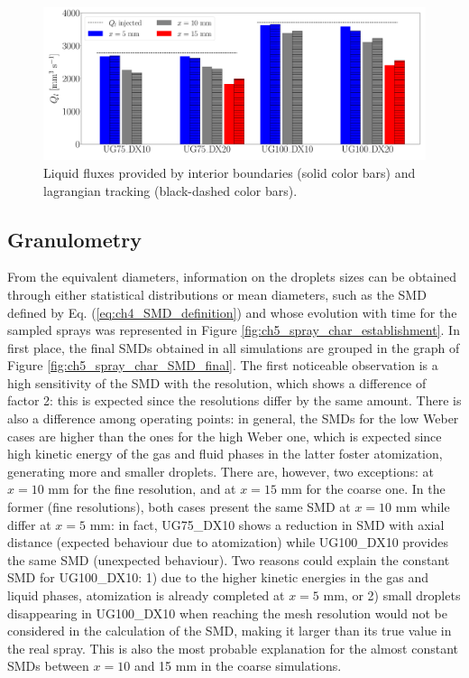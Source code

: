 \begin{figure}[ht]
	\centering
   \includegraphics[scale=0.20]{./part2_developments/figures_ch5_resolved_JICF/SPRAY_characterization/establishment_and_fluxes/fluxes_SLI_vs_IBs}
   \caption{Liquid fluxes provided by interior boundaries (solid color bars) and lagrangian tracking (black-dashed color bars).}
   \label{fig:fluxes_bargraph_IBs_vs_LGS}
\end{figure}


\subsection{Granulometry}
\label{ch5:subsec_spray_char_granulo}

From the equivalent diameters, information on the droplets sizes can be obtained through either statistical distributions or mean diameters, such as the SMD defined by Eq. (\ref{eq:ch4_SMD_definition}) and whose evolution with time for the sampled sprays was represented in Figure \ref{fig:ch5_spray_char_establishment}. In first place, the final SMDs obtained in all simulations are grouped in the graph of Figure \ref{fig:ch5_spray_char_SMD_final}. The first noticeable observation is a high sensitivity of the SMD with the resolution, which shows a difference of factor 2: this is expected since the resolutions differ by the same amount. There is also a difference among operating points: in general, the SMDs for the low Weber cases are higher than the ones for the high Weber one, which is expected since high kinetic energy of the gas and fluid phases in the latter foster atomization, generating more and smaller droplets. There are, however, two exceptions: at $x = 10$ mm for the fine resolution, and at $x = 15$ mm for the coarse one. In the former (fine resolutions), both cases present the same SMD at $x = 10$ mm while differ at $x = 5$ mm: in fact, UG75\_DX10 shows a reduction in SMD with axial distance (expected behaviour due to atomization) while UG100\_DX10 provides the same SMD (unexpected behaviour). Two reasons could explain the constant SMD for UG100\_DX10: 1) due to the higher kinetic energies in the gas and liquid phases, atomization is already completed at $x = 5$ mm, or 2) small droplets disappearing in UG100\_DX10 when reaching the mesh resolution would not be considered in the calculation of the SMD, making it larger than its true value in the real spray. This is also the most probable explanation for the almost constant SMDs between $x = 10$ and 15 mm in the coarse simulations.

